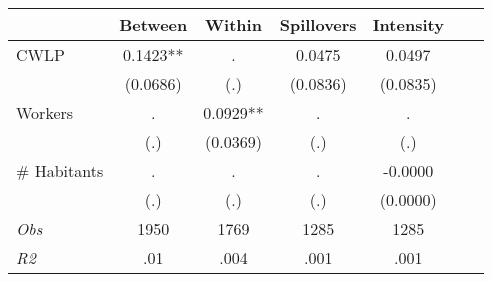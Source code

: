 \begin{tabular}{l*{6}{c}}\hline&\multicolumn{1}{c}{Between}&\multicolumn{1}{c}{Within}&\multicolumn{1}{c}{Spillovers}&\multicolumn{1}{c}{Intensity}\\ \hline 
CWLP & 0.1423** & . & 0.0475 & 0.0497 \\
 & (0.0686) & (.) & (0.0836) & (0.0835) \\
Workers & . & 0.0929** & . & . \\
 & (.) & (0.0369) & (.) & (.) \\
\# Habitants & . & . & . & -0.0000 \\
  & (.) & (.) & (.) & (0.0000) \\
\hline \textit{Obs} & 1950 & 1769 & 1285 & 1285  \\ \textit{R2} & .01 & .004 & .001 & .001 \\ \hline \end{tabular}
